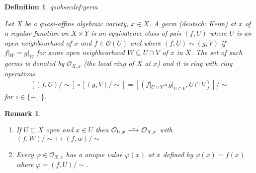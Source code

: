 \documentclass[DIV=14,parskip=full,pointednumbers]{scrartcl}
\renewcommand{\phi}{\varphi}
\newenvironment{alphanumerate}{\begin{enumerate}[label={\upshape(\alph*)},ref=\curthm]}{\end{enumerate}}
\theoremstyle{cthm}
\theoremstyle{cvarthm}
\theoremstyle{cdef}
\newtheorem{defi}{Definition}[subsection]
\newtheorem{rem}{Remark}[subsection]
\newcommand{\lbl}[1]{
	\label{#1}
	\ifmmode
	\expandafter\xdef\csname eqsubsec#1\endcsname{\thesubsection}
	\fi
}
\newcommand{\Oo}{\mathcal{O}}
\newcommand{\isomorphism}{
	\tikz[baseline=(a.base)] \node (a) at (0,0) {$\longrightarrow$} node[above=-0.25ex] {\tiny $\sim$};}
\renewcommand{\phi}{\varphi}
\begin{document}
	\begin{defi}\lbl{def:germ}
		Let $X$ be a quasi-affine algebraic variety, $x\in X$. A \emph{germ} (deutsch: \emph{Keim}) at $x$ of a regular function on $X\times Y$ is an equivalence class of pais $(f,U)$ where $U$ is an open neighbourhood of $x$ and $f\in\Oo(U)$ and where $(f,U)\sim (g,V)$ if $f|_W = g|_W$ for some open neighbourhood $W\subseteq U\cap V$ of $x$ in $X$. The set of such germs is denoted by $\Oo_{X,x}$ (the local ring of $X$ at $x$) and it is ring with ring operations
		\begin{align*}
			\left[(f,U)/\sim\right] \circ \left[(g,V)/\sim\right] = \left[(f|_{U\cap V} \circ g|_{U\cap V}, U\cap V)\right]/\sim
		\end{align*}
		for $\circ\in\{+,\cdot\}$.
	\end{defi}
	\begin{rem}
	\begin{alphanumerate}
	\item 
		If $U\subseteq X$ open and $x\in U$ then $\Oo_{U,x} \isomorphism \Oo_{X,x}$ with $(f,W)/\sim \mapsto (f,w)/\sim$
	\item 
		Every $\phi\in \Oo_{X,x}$ has a unique value $\phi(x)$ at $x$ defined by $\phi(x) = f(x)$ where $\phi=(f,U)/\sim$.
	\end{alphanumerate}
 
	\end{rem}
\end{document}
